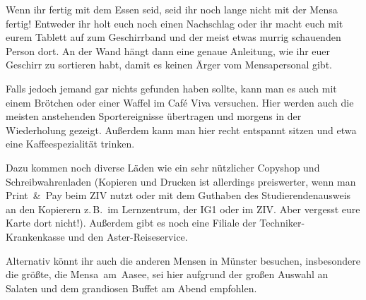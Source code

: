 \begin{multicols*}{2}
Wenn ihr fertig mit dem Essen seid, seid ihr noch lange nicht mit der Mensa fertig!
Entweder ihr holt euch noch einen Nachschlag oder ihr macht euch mit eurem Tablett auf zum Geschirrband und der meist etwas murrig schauenden Person dort.
An der Wand hängt dann eine genaue Anleitung, wie ihr euer Geschirr zu sortieren habt, damit es keinen Ärger vom Mensapersonal gibt.


Falls jedoch jemand gar nichts gefunden haben sollte, kann man es auch mit einem Brötchen oder einer Waffel im Café Viva versuchen.
Hier werden auch die meisten anstehenden Sportereignisse übertragen und morgens in der Wiederholung gezeigt.
Außerdem kann man hier recht entspannt sitzen und etwa eine Kaffeespezialität trinken.


Dazu kommen noch diverse Läden wie ein sehr nützlicher Copyshop und Schreibwahrenladen (Kopieren und Drucken ist allerdings preiswerter, wenn man Print~\&~Pay beim ZIV nutzt oder mit dem Guthaben des Studierendenausweis an den Kopierern z.\,B.\ im Lernzentrum, der IG1 oder im ZIV. Aber vergesst eure Karte dort nicht!). Außerdem gibt es noch eine Filiale der Techniker-Krankenkasse und den Aster-Reiseservice.

Alternativ könnt ihr auch die anderen Mensen in Münster besuchen, insbesondere die größte, die Mensa~am~Aasee, sei hier aufgrund der großen Auswahl an Salaten und dem grandiosen Buffet am Abend empfohlen.

\end{multicols*}
